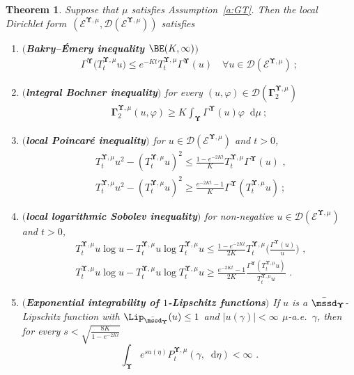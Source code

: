 \documentclass[11pt,letterpaper]{amsart}
\newcommand{\dom}[1]{\mathcal D(#1)}
\let\temp\phi
\let\phi\varphi
\let\varphi\temp
\newcommand{\diff}{\mathop{}\!\mathrm{d}}
\newcommand{\comma}{\,\,\mathrm{,}\;\,}
\newcommand{\fstop}{\,\,\mathrm{.}}
\newcommand{\cdc}{\Gamma}
\newcommand{\purple}[1]{{\color{purple}#1}}
\newcommand{\QP}{{\mu}}
\newcommand{\dUpsilon}{{\mathbf \Upsilon}}
\newcommand{\U}{\dUpsilon}
\newcommand{\E}{\mathcal E}
\renewcommand{\1}{\mathbf 1}
\numberwithin{equation}{section}
\theoremstyle{plain}
\newtheorem{thm}{Theorem}[section]
\theoremstyle{definition}
\theoremstyle{remark}
\begin{document}
\begin{thm}\label{t:GT}
Suppose that $\QP$ satisfies Assumption~\ref{a:GT}.  Then the local Dirichlet form~$(\E^{\U, \QP}, \dom{\E^{\U, \QP}})$ satisfies
\begin{enumerate}[$(a)$]
\item {\bf $($Bakry--\'Emery inequality $\BE(K,\infty)$$)$}
\begin{align*}
\cdc^{\U}\bigl(T_t^{\U, \mu} u\bigr) \le e^{-Kt}T_t^{\U, \mu} \cdc^{\U}(u) \quad \forall u \in  \dom{\E^{\U, \mu}} \ ; %
\end{align*}
\item$(${\bf lntegral Bochner inequality}$)$ for every $(u, \phi) \in \dom{\mathbf \cdc^{\U, \QP}_2}$
\begin{align*}
\mathbf \cdc^{\U, \QP}_2(u, \phi) \ge K \int_{\U} \cdc^{\U}(u) \phi \diff \QP \ ;
\end{align*}
\item $(${\bf local Poincar\'e inequality}$)$  for $u \in \dom{\E^{\U, \QP}}$ and $t >0$,
\begin{align*}
&T^{\U, \QP}_tu^2- (T^{\U, \QP}_tu)^2 \le \frac{1-e^{-2Kt}}{K}T^{\U, \QP}_t\cdc^{\U}(u)  \comma
\\
&T^{\U, \QP}_tu^2- (T^{\U, \QP}_tu)^2 \ge \frac{e^{-2Kt}-1}{K}\cdc^{\U} (T^{\U, \QP}_tu) \ ;
\end{align*}
\item $(${\bf  local logarithmic Sobolev inequality}$)$ for non-negative $u \in \dom{\E^{\U, \QP}}$ and $t>0$,
\begin{align*}
&T^{\U, \QP}_tu\log u- T^{\U, \QP}_tu\log T^{\U, \QP}_t u \le \frac{1-e^{-2Kt}}{2K}T^{\U, \QP}_t\biggl( \frac{\cdc^{\U}(u)}{u} \biggr) \comma
\\
&T^{\U, \QP}_tu\log u- T^{\U, \QP}_tu\log T^{\U, \QP}_t u \ge \frac{e^{-2Kt}-1}{2K} \frac{\cdc^{\U}(T^{\U, \QP}_t u)}{T^{\U, \QP}_t u}  \fstop
\end{align*}
\item$(${\bf Exponential integrability of $1$-Lipschitz functions}$)$
 If $u$ is a $\bar{\mssd}_\U$-Lipschitz function with $\Lip_{\bar{\mssd}_\U}(u) \le 1$ and $|u(\gamma)|<\infty$ $\QP$-a.e.~$\gamma$, then for every $s<\sqrt{\frac{8K}{1-e^{-2Kt}}}$
$$\int_{\U} e^{s u(\eta)} P_t^{\U, \QP}(\gamma, \diff \eta)<\infty \fstop$$

\end{enumerate}
\end{thm}
\end{document}

